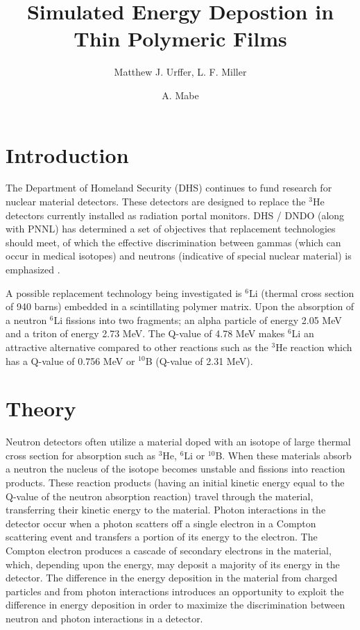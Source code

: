 \documentclass{anstrans}
\title{Simulated Energy Depostion in Thin Polymeric Films}
\author{Matthew J. Urffer, L. F. Miller \and A. Mabe}
\institute{
University of Tennessee, Knoxville, TN, 37916
}
\newcommand{\iso}[2]{${}^{#2}${#1}}
\begin{document}
\section{Introduction}
The Department of Homeland Security (DHS) continues to fund research for nuclear material detectors.
These detectors are designed to replace the \iso{He}{3} detectors currently installed as radiation portal monitors.
DHS / DNDO (along with PNNL) has determined a set of objectives that replacement technologies should meet, of which the effective discrimination between gammas (which can occur in medical isotopes) and neutrons (indicative of special nuclear material) is emphasized \cite{kouzes_neutron_2010,kouzes_neutron_1999}. 

A possible replacement technology being investigated is \iso{Li}{6} (thermal cross section of 940 barns) embedded in a scintillating polymer matrix.
Upon the absorption of a neutron \iso{Li}{6} fissions into two fragments; an alpha particle of energy 2.05 MeV and a triton of energy 2.73 MeV.
The Q-value of 4.78 MeV makes \iso{Li}{6} an attractive alternative compared to other reactions such as the \iso{He}{3} reaction which has a Q-value of 0.756 MeV or \iso{B}{10} (Q-value of 2.31 MeV).

\section{Theory}
Neutron detectors often utilize a material doped with an isotope of large thermal cross section for absorption such as \iso{He}{3}, \iso{Li}{6} or \iso{B}{10}. 
When these materials absorb a neutron the nucleus of the isotope becomes unstable and fissions into reaction products.
These reaction products (having an initial kinetic energy equal to the Q-value of the neutron absorption reaction) travel through the material, transferring their kinetic energy to the material.
Photon interactions in the detector occur when a photon scatters off a single electron in a Compton scattering event and transfers a portion of its energy to the electron.
The Compton electron produces a cascade of secondary electrons in the material, which, depending upon the energy, may deposit a majority of its energy in the detector.
The difference in the energy deposition in the material from charged particles and from photon interactions introduces an opportunity to exploit the difference in energy deposition in order to maximize the discrimination between neutron and photon interactions in a detector.
\end{document}
